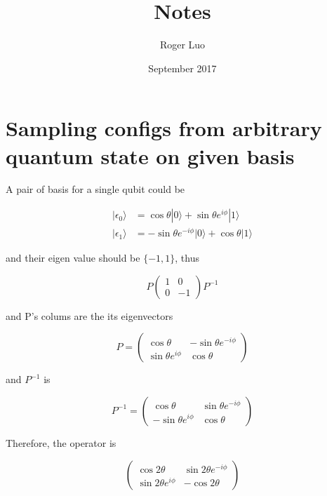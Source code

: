 \documentclass{article}
\title{Notes}
\author{Roger Luo}
\date{September 2017}
\newcommand{\rket}[1]{|#1\rangle}
\begin{document}
\maketitle

\section{Sampling configs from arbitrary quantum state on given basis}\label{sampling}

A pair of basis for a single qubit could be

\begin{equation}
\begin{aligned}
\rket{\epsilon_0} &= \cos{\theta}\rket{0} + \sin{\theta} e^{i\phi}\rket{1}\\
\rket{\epsilon_1} &= -\sin{\theta} e^{-i\phi}\rket{0} + \cos{\theta}\rket{1}
\end{aligned}
\end{equation}

and their eigen value should be $\{-1, 1\}$, thus

\begin{equation}
P
\begin{pmatrix}
1 & 0\\
0 & -1
\end{pmatrix}
P^{-1}
\end{equation}

and P's colums are the its eigenvectors

\begin{equation}
P =
\begin{pmatrix}
\cos{\theta} & -\sin{\theta} e^{-i\phi}\\
\sin{\theta} e^{i\phi} & \cos{\theta}
\end{pmatrix}
\end{equation}

and $P^{-1}$ is

\begin{equation}
P^{-1} =
\begin{pmatrix}
\cos{\theta} & \sin{\theta}e^{-i\phi}\\
-\sin{\theta}e^{i\phi} & \cos{\theta}
\end{pmatrix}
\end{equation}

Therefore, the operator is

\begin{equation}
\begin{pmatrix}
\cos{2\theta} & \sin{2\theta}e^{-i\phi}\\
\sin{2\theta}e^{i\phi} & -\cos{2\theta}
\end{pmatrix}
\end{equation}
\end{document}
